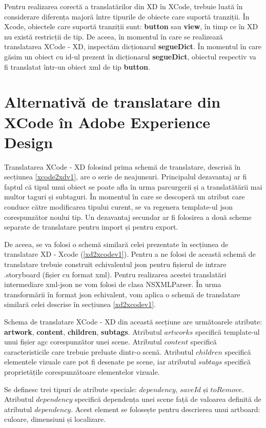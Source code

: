 Pentru realizarea corectă a translatărilor din XD în XCode, trebuie luată în considerare diferența majoră între tipurile de obiecte care suportă tranziții. În Xcode, obiectele care suportă tranziții sunt: \textbf{button} sau \textbf{view}, în timp ce în XD nu există restricții de tip. De aceea, în momentul în care se realizează translatarea XCode - XD, inspectăm dicționarul \textbf{segueDict}. În momentul în care găsim un obiect cu id-ul prezent în dicționarul \textbf{segueDict}, obiectul respectiv va fi translatat într-un obiect xml de tip \textbf{button}.

\section {Alternativă de translatare din XCode în Adobe Experience Design} \label{xcxd2schema}

Translatarea XCode - XD folosind prima schemă de translatare, descrisă în secțiunea \ref{xcode2xdv1}, are o serie de neajunsuri. Principalul dezavantaj ar fi faptul că tipul unui obiect se poate afla în urma parcurgerii și a translatătării mai multor taguri și subtaguri. În momentul în care se descoperă un atribut care conduce către modificarea tipului curent, se va regenera template-ul json corespunzător noului tip.  
Un dezavantaj secundar ar fi folosirea a două scheme separate de translatare pentru import și pentru export.

De aceea, se va folosi o schemă similară celei prezentate în secțiunea de translatare XD - Xcode (\ref{xd2xcodev1}). Pentru a ne folosi de această schemă de translatare trebuie construit echivalentul json pentru fișierul de intrare .storyboard (fișier cu format xml). Pentru realizarea acestei translatări intermediare xml-json ne vom folosi de clasa NSXMLParser. În urma transformării în format json echivalent, vom aplica o schemă de translatare similară celei descrise în secțiunea \ref{xd2xcodev1}.

Schema de translatare XCode - XD din această secțiune are următoarele atribute: \textbf{artwork}, \textbf{content}, \textbf{children}, \textbf{subtags}. Atributul $artworks$ specifică template-ul unui fișier agc corespunzător unei scene. Atributul $content$ specifică caracteristicile care trebuie preluate dintr-o scenă. Atributul $children$ specifică elementele vizuale care pot fi desenate pe scene, iar atributul $subtags$ specifică proprietățile corespunzătoare elementelor vizuale.

Se definesc trei tipuri de atribute speciale: $dependency$, $saveId$ și $toRemove$. Atributul $dependency$ specifică
dependența unei scene față de valoarea definită de atributul $dependency$. Acest element se folosește pentru descrierea unui artboard: culoare, dimensiuni și localizare.

